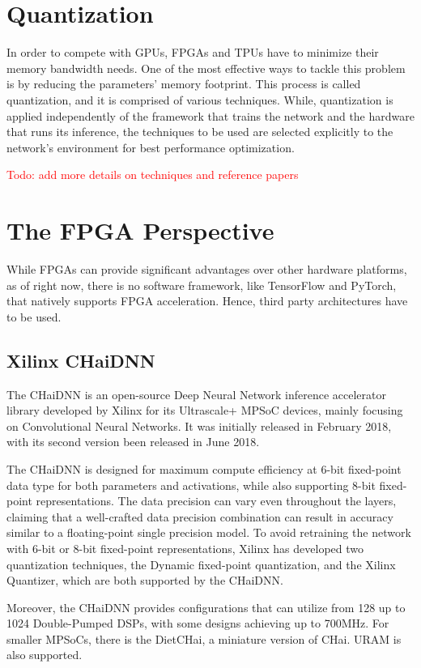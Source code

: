 \section{Quantization}
In order to compete with GPUs, FPGAs and TPUs have to minimize their memory bandwidth needs. One of the most effective ways to tackle this problem is by reducing the parameters' memory footprint. This process is called quantization, and it is comprised of various techniques. While, quantization is applied independently of the framework that trains the network and the hardware that runs its inference, the techniques to be used are selected explicitly to the network's environment for best performance optimization.

\textcolor{red}{
Todo: add more details on techniques and reference papers
}

\section{The FPGA Perspective}
While FPGAs can provide significant advantages over other hardware platforms, as of right now, there is no software framework, like TensorFlow and PyTorch, that natively supports FPGA acceleration. Hence, third party architectures have to be used.

\subsection{Xilinx CHaiDNN}
The CHaiDNN \cite{CHaiDNN-GitHub} is an open-source Deep Neural Network inference accelerator library developed by Xilinx for its Ultrascale+ MPSoC devices, mainly focusing on Convolutional Neural Networks. It was initially released in February 2018, with its second version been released in June 2018.

The CHaiDNN is designed for maximum compute efficiency at 6-bit fixed-point data type for both parameters and activations, while also supporting 8-bit fixed-point representations. The data precision can vary even throughout the layers, claiming that a well-crafted data precision combination can result in accuracy similar to a floating-point single precision model. To avoid retraining the network with 6-bit or 8-bit fixed-point representations, Xilinx has developed two quantization techniques, the Dynamic fixed-point quantization, and the Xilinx Quantizer, which are both supported by the CHaiDNN.

Moreover, the CHaiDNN provides configurations that can utilize from 128 up to 1024 Double-Pumped DSPs, with some designs achieving up to 700MHz. For smaller MPSoCs, there is the DietCHai, a miniature version of CHai. URAM is also supported.

